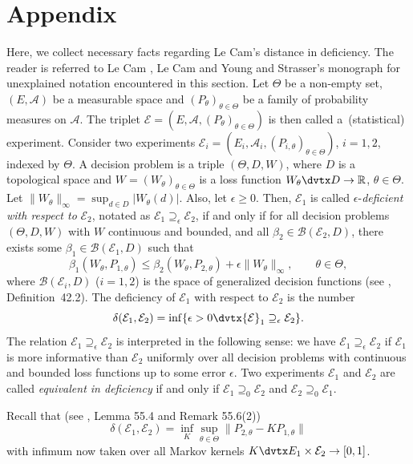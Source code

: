 \documentclass[number,citesort,seceqn,dvips]{arxbj}
\newcommand{\RR}{\mathbb{R}}
\newcommand{\AAA}{{\mathcal A}}
\newcommand{\BBB}{{\mathcal B}}
\newcommand{\EEE}{{\mathcal E}}
\begin{document}
\begin{appendix}\label{appendix}
\section*{Appendix}

Here, we collect necessary facts regarding Le Cam's distance in
deficiency. The reader is referred to Le Cam \cite{LC86}, Le Cam and
Young \cite{LY90} and Strasser's monograph \cite{St85} for unexplained
notation encountered in this section. Let $\Theta$ be a non-empty set,
$(E,\AAA)$ be a measurable space and $(P_{\theta})_{\theta\in\Theta}$
be a family of probability measures on $\AAA$. The triplet
$\EEE=(E,\AAA,(P_{\theta})_{\theta\in\Theta})$ is then called a~(statistical) experiment. Consider two experiments
$\EEE_i=(E_i,\AAA_i,(P_{i,\theta})_{\theta\in\Theta})$, $i=1,2$,
indexed by $\Theta$. A decision problem is a triple $(\Theta,D,W)$,
where $D$ is a topological space and $W=(W_\theta)_{\theta\in\Theta}$
is a loss function $W_\theta\dvtx D\to\RR$, $\theta\in\Theta$. Let
$\|W_\theta\|_{\infty}=\sup_{d\in D}|W_\theta(d)|$. Also, let
$\epsilon\ge0$. Then, $\EEE_1$ is called $\epsilon$-\textit{deficient
with respect to} $\EEE_2$, notated as $\EEE_1\supseteq_\epsilon
\EEE_2$, if and only if for all decision problems $(\Theta,D,W)$ with
$W$ continuous and bounded, and all $\beta_2\in\BBB(\EEE_2,D)$, there
exists some $\beta_1\in\BBB(\EEE_1,D)$ such that
%
\[
\beta_1(W_\theta,P_{1,\theta})\le\beta_2(W_\theta,P_{2,\theta
})+\epsilon\|W_\theta\|_{\infty} ,\qquad  \theta\in\Theta ,
\]
%
where $\BBB(\EEE_i,D)$ ($i=1,2$) is the space of generalized
decision functions (see \cite{St85}, Definition~42.2). The deficiency
of $\EEE_1$ with respect to $\EEE_2$ is the number
%
\begin{equation}\label{defdeffic}
\delta(\EEE_1,\EEE_2) = \inf\{\epsilon>0 \dvtx \EEE_1\supseteq
_\epsilon
\EEE_2\} .
\end{equation}
%
The relation $\EEE_1\supseteq_\epsilon
\EEE_2$ is interpreted in the following sense: we have
$\EEE_1\supseteq_\epsilon\EEE_2$ if $\EEE_1$ is more informative than
$\EEE_2$ uniformly over all decision problems with continuous and
bounded loss functions up to some error $\epsilon$. Two experiments
$\EEE_1$ and $\EEE_2$ are called \textit{equivalent in deficiency} if and
only if $\EEE_1\supseteq_0 \EEE_2$ and $\EEE_2\supseteq_0 \EEE_1$.

Recall that (see \cite{St85}, Lemma 55.4 and Remark 55.6(2))
%
\begin{equation}\label{defMarkov}
\delta(\EEE_1,\EEE_2) = \inf_K \sup_{\theta\in\Theta}  \|
P_{2,\theta} - K P_{1,\theta} \|
\end{equation}
%
with infimum now taken over all Markov kernels $K\dvtx E_1\times\EEE_2\to
[0,1]$.


\end{appendix}
\end{document}
